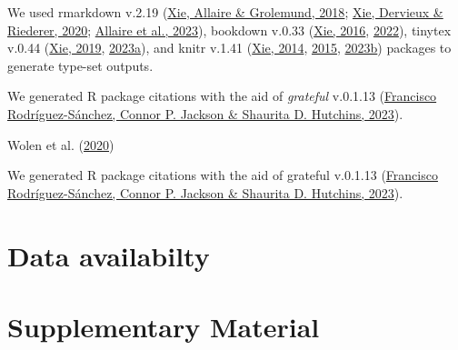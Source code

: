 \documentclass[10pt,a4paper]{article}
\begin{document}
We used rmarkdown v.2.19 (\protect\hyperlink{ref-rmarkdown2018}{Xie, Allaire \& Grolemund, 2018}; \protect\hyperlink{ref-rmarkdown2020}{Xie, Dervieux \& Riederer, 2020}; \protect\hyperlink{ref-rmarkdown2023}{Allaire et al., 2023}), bookdown v.0.33 (\protect\hyperlink{ref-bookdown2016}{Xie, 2016}, \protect\hyperlink{ref-R-bookdown}{2022}), tinytex v.0.44 (\protect\hyperlink{ref-tinytex2019}{Xie, 2019}, \protect\hyperlink{ref-tinytex2023}{2023a}), and knitr v.1.41 (\protect\hyperlink{ref-knitr2014}{Xie, 2014}, \protect\hyperlink{ref-knitr2015}{2015}, \protect\hyperlink{ref-knitr2023}{2023b}) packages to generate type-set outputs.

We generated R package citations with the aid of \emph{grateful} v.0.1.13 (\protect\hyperlink{ref-grateful}{Francisco Rodríguez-Sánchez, Connor P. Jackson \& Shaurita D. Hutchins, 2023}).

Wolen et al. (\protect\hyperlink{ref-osfr}{2020})

We generated R package citations with the aid of grateful v.0.1.13 (\protect\hyperlink{ref-grateful}{Francisco Rodríguez-Sánchez, Connor P. Jackson \& Shaurita D. Hutchins, 2023}).

\hypertarget{data-availabilty}{%
\section{Data availabilty}\label{data-availabilty}}

\hypertarget{supplementary-material}{%
\section{Supplementary Material}\label{supplementary-material}}
\end{document}
